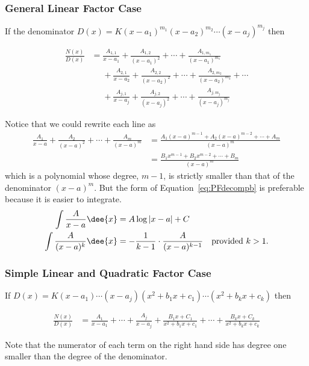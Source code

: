 \subsubsection*{General Linear Factor Case}
If the denominator
$
D(x)=K(x-a_1)^{m_1}(x-a_2)^{m_2}\cdots(x-a_j)^{m_j}
$
then
\begin{impeqn}\label{eq:PFdecompb}
\begin{align*}
\frac{N(x)}{D(x)}
&=\frac{A_{1,1}}{x-a_1}+\frac{A_{1,2}}{(x-a_1)^2}+\cdots
          +\frac{A_{1,m_1}}{(x-a_1)^{m_1}}\\
&\phantom{=}+\frac{A_{2,1}}{x-a_2}+\frac{A_{2,2}}{(x-a_2)^2}+\cdots
          +\frac{A_{2,m_2}}{(x-a_2)^{m_2}}+\cdots\\
&\phantom{=}+\frac{A_{j,1}}{x-a_j}+\frac{A_{j,2}}{(x-a_j)^2}+\cdots
          +\frac{A_{j,m_j}}{(x-a_j)^{m_j}}
\end{align*}
\end{impeqn}
Notice that we could rewrite each line as
\begin{align*}
\frac{A_{1}}{x-a}+\frac{A_{2}}{(x-a)^2}+\cdots+\frac{A_{m}}{(x-a)^{m}}
&=\frac{A_{1}(x-a)^{m-1}+A_{2}(x-a)^{m-2}+\cdots+A_{m}}{(x-a)^m}\\
&=\frac{B_{1}x^{m-1}+B_{2}x^{m-2}+\cdots+B_{m}}{(x-a)^m}
\end{align*}
which is a polynomial whose degree, $m-1$, is strictly smaller than that
of the denominator $(x-a)^m$. But the form of Equation~\eqref{eq:PFdecompb} is preferable
because it is easier to integrate.
\begin{align*}
  \int \frac{A}{x-a}\dee{x} &= A \log|x-a| +C\\
  \int \frac{A}{(x-a)^k} \dee{x} &= -\frac{1}{k-1} \cdot \frac{A}{(x-a)^{k-1}} &
\text{provided }k>1.
\end{align*}


\subsubsection*{Simple Linear and Quadratic Factor Case}
If
$
D(x)=K(x-a_1)\cdots(x-a_j)(x^2+b_1x+c_1)\cdots(x^2+b_kx+c_k)
$
then
\begin{impeqn}\label{eq:PFdecompc}
\begin{align*}
\frac{N(x)}{D(x)}
&=\frac{A_1}{x-a_1}+\cdots+\frac{A_j}{x-a_j}
+\frac{B_1x+C_1}{x^2+b_1x+c_1}+\cdots+\frac{B_kx+C_k}{x^2+b_kx+c_k}
\end{align*}
\end{impeqn}
Note that the numerator of each term on the right hand side has degree
one smaller than the degree of the denominator.

